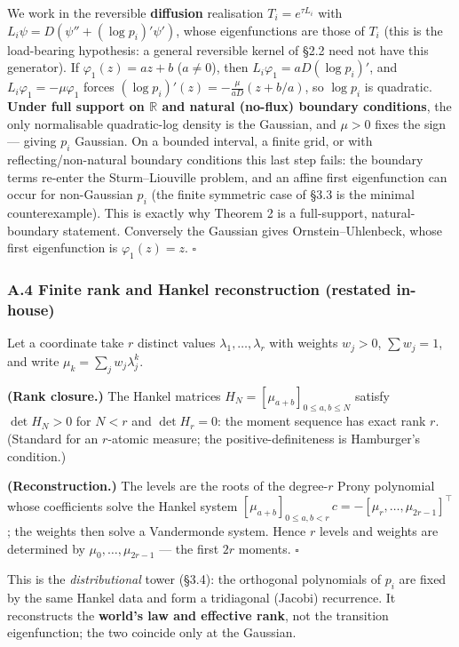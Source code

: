 \documentclass[
  letterpaper,
  11pt]{article}
\theoremstyle{plain}
\theoremstyle{definition}
\theoremstyle{remark}
\begin{document}
We work in the reversible \textbf{diffusion} realisation \(T_i=e^{\tau L_i}\) with \(L_i\psi = D(\psi''+(\log p_i)'\psi')\), whose eigenfunctions are those of \(T_i\) (this is the load-bearing hypothesis: a general reversible kernel of §2.2 need not have this generator). If \(\varphi_1(z)=az+b\) (\(a\ne 0\)), then \(L_i\varphi_1 = aD(\log p_i)'\), and \(L_i\varphi_1=-\mu\varphi_1\) forces \((\log p_i)'(z) = -\tfrac{\mu}{aD}(z+b/a)\), so \(\log p_i\) is quadratic. \textbf{Under full support on \(\mathbb R\) and natural (no-flux) boundary conditions}, the only normalisable quadratic-log density is the Gaussian, and \(\mu>0\) fixes the sign --- giving \(p_i\) Gaussian. On a bounded interval, a finite grid, or with reflecting/non-natural boundary conditions this last step fails: the boundary terms re-enter the Sturm--Liouville problem, and an affine first eigenfunction can occur for non-Gaussian \(p_i\) (the finite symmetric case of §3.3 is the minimal counterexample). This is exactly why Theorem 2 is a full-support, natural-boundary statement. Conversely the Gaussian gives Ornstein--Uhlenbeck, whose first eigenfunction is \(\varphi_1(z)=z\). \(\square\)

\subsubsection{A.4 Finite rank and Hankel reconstruction (restated in-house)}\label{sec:A4}

Let a coordinate take \(r\) distinct values \(\lambda_1,\dots,\lambda_r\) with weights \(w_j>0\), \(\sum w_j=1\), and write \(\mu_k=\sum_j w_j\lambda_j^k\).

\textbf{(Rank closure.)} The Hankel matrices \(H_N=[\mu_{a+b}]_{0\le a,b\le N}\) satisfy \(\det H_N>0\) for \(N<r\) and \(\det H_r=0\): the moment sequence has exact rank \(r\). (Standard for an \(r\)-atomic measure; the positive-definiteness is Hamburger's condition.)

\textbf{(Reconstruction.)} The levels are the roots of the degree-\(r\) Prony polynomial whose coefficients solve the Hankel system \([\mu_{a+b}]_{0\le a,b<r}\,c = -[\mu_r,\dots,\mu_{2r-1}]^\top\); the weights then solve a Vandermonde system. Hence \(r\) levels and weights are determined by \(\mu_0,\dots,\mu_{2r-1}\) --- the first \(2r\) moments. \(\square\)

This is the \emph{distributional} tower (§3.4): the orthogonal polynomials of \(p_i\) are fixed by the same Hankel data and form a tridiagonal (Jacobi) recurrence. It reconstructs the \textbf{world's law and effective rank}, not the transition eigenfunction; the two coincide only at the Gaussian.
\end{document}
